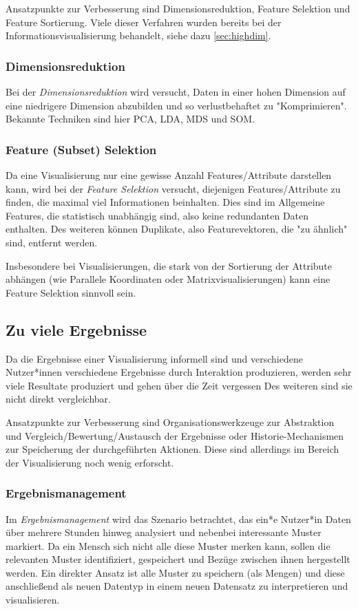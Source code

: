 			Ansatzpunkte zur Verbesserung sind \zB Dimensionsreduktion, Feature Selektion und Feature Sortierung. Viele dieser Verfahren wurden bereits bei der Informationsvisualisierung behandelt, siehe dazu \autoref{sec:highdim}.

			\subsubsection{Dimensionsreduktion}
				Bei der \emph{Dimensionsreduktion} wird versucht, Daten in einer hohen Dimension auf eine niedrigere Dimension abzubilden und so verlustbehaftet zu "Komprimieren". Bekannte Techniken sind hier \zB PCA, LDA, MDS und SOM.

			\subsubsection{Feature (Subset) Selektion}
				Da eine Visualisierung nur eine gewisse Anzahl Features/Attribute darstellen kann, wird bei der \emph{Feature Selektion} versucht, diejenigen Features/Attribute zu finden, die maximal viel Informationen beinhalten. Dies sind im Allgemeine Features, die statistisch unabhängig sind, also keine redundanten Daten enthalten. Des weiteren können Duplikate, also Featurevektoren, die "zu ähnlich" sind, entfernt werden.

				Insbesondere bei Visualisierungen, die stark von der Sortierung der Attribute abhängen (wie Parallele Koordinaten oder Matrixvisualisierungen) kann eine Feature Selektion sinnvoll sein.

		\subsection{Zu viele Ergebnisse}
			Da die Ergebnisse einer Visualisierung informell sind und verschiedene Nutzer*innen verschiedene Ergebnisse durch Interaktion produzieren, werden sehr viele Resultate produziert und gehen über die Zeit vergessen Des weiteren sind sie nicht direkt vergleichbar.

			Ansatzpunkte zur Verbesserung sind \zB Organisationswerkzeuge zur Abstraktion und Vergleich/Bewertung/Austausch der Ergebnisse oder Historie-Mechanismen zur Speicherung der durchgeführten Aktionen. Diese sind allerdings im Bereich der Visualisierung noch wenig erforscht.

			\subsubsection{Ergebnismanagement}
				Im \emph{Ergebnismanagement} wird das Szenario betrachtet, das ein*e Nutzer*in Daten über mehrere Stunden hinweg analysiert und nebenbei interessante Muster markiert. Da ein Mensch sich nicht alle diese Muster merken kann, sollen die relevanten Muster identifiziert, gespeichert und Bezüge zwischen ihnen hergestellt werden. Ein direkter Ansatz ist alle Muster zu speichern (als Mengen) und diese anschließend als neuen Datentyp in einem neuen Datensatz zu interpretieren und visualisieren.

